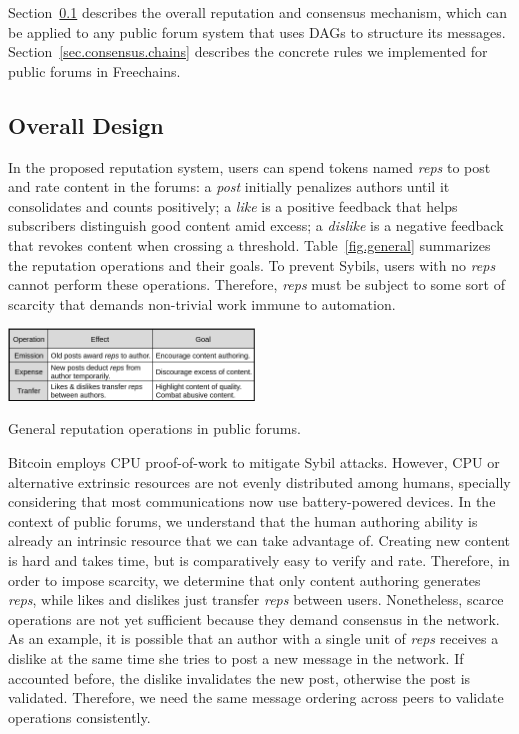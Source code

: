 \documentclass[10pt,journal,compsoc]{IEEEtran}
\newcommand{\FC}       {Freechains\xspace}
\newcommand{\reps}     {\emph{reps}\xspace}
\begin{document}
Section~\ref{sec.consensus.design} describes the overall reputation and
consensus mechanism, which can be applied to any public forum system that uses
DAGs to structure its messages.
Section~\ref{sec.consensus.chains} describes the concrete rules we implemented
for public forums in \FC.

\subsection{Overall Design}
\label{sec.consensus.design}

In the proposed reputation system, users can spend tokens named \reps to post
and rate content in the forums:
a \emph{post} initially penalizes authors until it consolidates and counts
positively;
a \emph{like} is a positive feedback that helps subscribers distinguish good
content amid excess;
a \emph{dislike} is a negative feedback that revokes content when crossing a
threshold.
Table~\ref{fig.general} summarizes the reputation operations and their goals.
To prevent Sybils, users with no \reps cannot perform these operations.
Therefore, \reps must be subject to some sort of scarcity that demands
non-trivial work immune to automation.

\begin{table}
\centering
\includegraphics[width=0.49\textwidth]{general.png}
\caption{General reputation operations in public forums.}
\label{fig.general}
\end{table}

Bitcoin employs CPU proof-of-work to mitigate Sybil attacks.
However, CPU or alternative extrinsic resources are not evenly distributed
among humans, specially considering that most communications now use
battery-powered devices.
%
In the context of public forums, we understand that the human authoring ability
is already an intrinsic resource that we can take advantage of.
Creating new content is hard and takes time, but is comparatively easy to
verify and rate.
Therefore, in order to impose scarcity, we determine that only content
authoring generates \reps, while likes and dislikes just transfer \reps between
users.
%
Nonetheless, scarce operations are not yet sufficient because they demand
consensus in the network.
As an example, it is possible that an author with a single unit of \reps
receives a dislike at the same time she tries to post a new message in the
network.
If accounted before, the dislike invalidates the new post, otherwise the post
is validated.
Therefore, we need the same message ordering across peers to validate
operations consistently.
\end{document}
